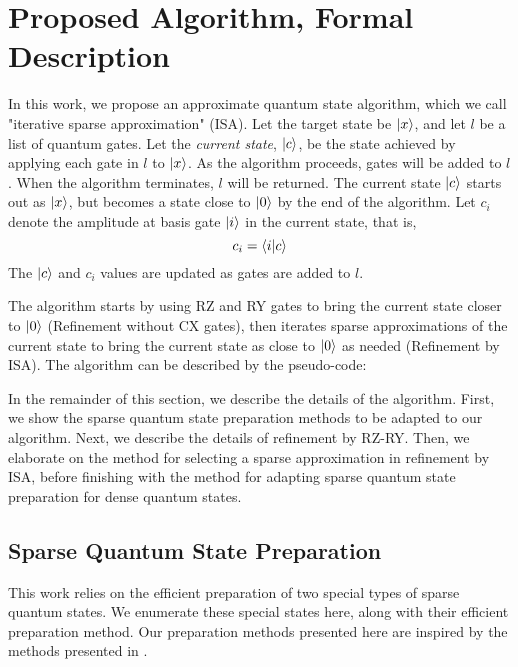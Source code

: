 \documentclass{article}
\begin{document}
\section{Proposed Algorithm, Formal Description}
In this work, we propose an approximate quantum state algorithm, which we call
"iterative sparse approximation" (ISA). Let the target
state be $\mathinner{|{x}\rangle}$, and let $l$ be a list of quantum gates. Let the 
\textit{current state}, $\mathinner{|{c}\rangle}$, be the state achieved by applying each gate 
in $l$ to $\mathinner{|{x}\rangle}$. As the algorithm proceeds, gates will be added
to $l$. When the algorithm terminates, $l$ will be returned. 
The current state $\mathinner{|{c}\rangle}$ starts out as $\mathinner{|{x}\rangle}$, but becomes a 
state close to $\mathinner{|{0}\rangle}$ by the end of the algorithm. Let $c_i$ denote
the amplitude at basis gate $\mathinner{|{i}\rangle}$ in the current state, that is,
$$c_i = \mathinner{\langle{i|c}\rangle}$$
The $\mathinner{|{c}\rangle}$ and $c_i$ values are updated as gates are added to $l$.

The algorithm starts by using RZ and RY gates to bring the current state
closer to $\mathinner{|{0}\rangle}$ (Refinement without CX gates), then iterates sparse 
approximations of the current state to bring the current state as close to 
$\mathinner{|{0}\rangle}$ as needed (Refinement by ISA). The 
algorithm can be described by the pseudo-code:
\begin{algorithmic}
	\EndWhile
	\EndWhile
\end{algorithmic}

In the remainder of this section, we describe the details of the algorithm.
First, we show the sparse quantum state preparation methods to be adapted to
our algorithm. Next, we describe the details of refinement by RZ-RY. Then,
we elaborate on the method for selecting a sparse approximation in refinement
by ISA, before finishing with the method for adapting sparse quantum state
preparation for dense quantum states.

\subsection{Sparse Quantum State Preparation}
This work relies on the efficient preparation of two special types of sparse
quantum states. We enumerate these special states here, along with their
efficient preparation method. Our preparation methods presented here are
inspired by the methods presented in \cite{Malvetti2021quantumcircuits}.
\end{document}
